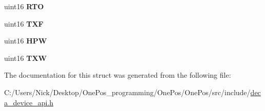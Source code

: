 \begin{DoxyCompactItemize}
\item 
\hypertarget{structdwt__deviceentcnts__t_a00f61509ebb982703c85b8c713849d89}{uint16 {\bfseries R\-T\-O}}\label{structdwt__deviceentcnts__t_a00f61509ebb982703c85b8c713849d89}

\item 
\hypertarget{structdwt__deviceentcnts__t_a158cce2581a33189ab79158eb5c90ff3}{uint16 {\bfseries T\-X\-F}}\label{structdwt__deviceentcnts__t_a158cce2581a33189ab79158eb5c90ff3}

\item 
\hypertarget{structdwt__deviceentcnts__t_a94042aacf11dc9d19480312f1e56267d}{uint16 {\bfseries H\-P\-W}}\label{structdwt__deviceentcnts__t_a94042aacf11dc9d19480312f1e56267d}

\item 
\hypertarget{structdwt__deviceentcnts__t_aaae5eba71cb905f334eb58b55191f48b}{uint16 {\bfseries T\-X\-W}}\label{structdwt__deviceentcnts__t_aaae5eba71cb905f334eb58b55191f48b}

\end{DoxyCompactItemize}


The documentation for this struct was generated from the following file\-:\begin{DoxyCompactItemize}
\item 
C\-:/\-Users/\-Nick/\-Desktop/\-One\-Pos\-\_\-programming/\-One\-Pos/\-One\-Pos/src/include/\hyperlink{deca__device__api_8h}{deca\-\_\-device\-\_\-api.\-h}\end{DoxyCompactItemize}
